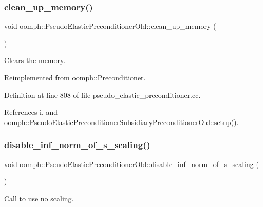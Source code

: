 \subsubsection{\texorpdfstring{clean\+\_\+up\+\_\+memory()}{clean\_up\_memory()}}
{\footnotesize\ttfamily void oomph\+::\+Pseudo\+Elastic\+Preconditioner\+Old\+::clean\+\_\+up\+\_\+memory (\begin{DoxyParamCaption}{ }\end{DoxyParamCaption})\hspace{0.3cm}{\ttfamily [virtual]}}



Clears the memory. 



Reimplemented from \hyperlink{classoomph_1_1Preconditioner_a46c31c416829bedcd9db238431262027}{oomph\+::\+Preconditioner}.



Definition at line 808 of file pseudo\+\_\+elastic\+\_\+preconditioner.\+cc.



References i, and oomph\+::\+Pseudo\+Elastic\+Preconditioner\+Subsidiary\+Preconditioner\+Old\+::setup().

\mbox{\label{classoomph_1_1PseudoElasticPreconditionerOld_a5b23f319564110f34c07fbaacd40e446}} 
\subsubsection{\texorpdfstring{disable\+\_\+inf\+\_\+norm\+\_\+of\+\_\+s\+\_\+scaling()}{disable\_inf\_norm\_of\_s\_scaling()}}
{\footnotesize\ttfamily void oomph\+::\+Pseudo\+Elastic\+Preconditioner\+Old\+::disable\+\_\+inf\+\_\+norm\+\_\+of\+\_\+s\+\_\+scaling (\begin{DoxyParamCaption}{ }\end{DoxyParamCaption})\hspace{0.3cm}{\ttfamily [inline]}}



Call to use no scaling. 



